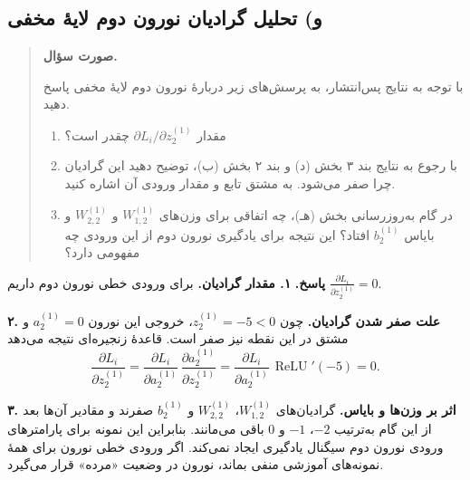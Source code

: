 \documentclass{article}
\numberwithin{equation}{section}
\numberwithin{table}{section}
\DeclareMathOperator{\ReLU}{ReLU}
\newenvironment{questionprompt}{%
    \begin{quote}\noindent\textbf{صورت سؤال.}\enspace\ignorespaces
}{%
    \end{quote}\noindent\textbf{پاسخ.}\enspace\ignorespacesafterend
}
\begin{document}
\subsection*{و) تحلیل گرادیان نورون دوم لایهٔ مخفی}
\begin{questionprompt}
    با توجه به نتایج پس‌انتشار، به پرسش‌های زیر دربارهٔ نورون دوم لایهٔ مخفی پاسخ دهید.
    \begin{enumerate}
        \item مقدار \(\partial L_i/\partial z_2^{(1)}\) چقدر است؟
        \item با رجوع به نتایج بند ۳ بخش (د) و بند ۲ بخش (ب)، توضیح دهید این گرادیان چرا صفر می‌شود. به مشتق تابع و مقدار ورودی آن اشاره کنید.
        \item در گام به‌روزرسانی بخش (هـ)، چه اتفاقی برای وزن‌های \(W_{1,2}^{(1)}\) و \(W_{2,2}^{(1)}\) و بایاس \(b_2^{(1)}\) افتاد؟ این نتیجه برای یادگیری نورون دوم از این ورودی چه مفهومی دارد؟
    \end{enumerate}
\end{questionprompt}
\textbf{۱. مقدار گرادیان.}
برای ورودی خطی نورون دوم داریم \(\frac{\partial L_i}{\partial z_2^{(1)}}=0\).

\noindent\textbf{۲. علت صفر شدن گرادیان.}
چون \(z_2^{(1)}=-5<0\)، خروجی این نورون \(a_2^{(1)}=0\) و مشتق  در این نقطه نیز صفر است. قاعدهٔ زنجیره‌ای نتیجه می‌دهد
\[
    \frac{\partial L_i}{\partial z_2^{(1)}}=
    \frac{\partial L_i}{\partial a_2^{(1)}}\,
    \frac{\partial a_2^{(1)}}{\partial z_2^{(1)}}
    =\frac{\partial L_i}{\partial a_2^{(1)}}\,\ReLU'(-5)=0.
\]

\noindent\textbf{۳. اثر بر وزن‌ها و بایاس.}
گرادیان‌های \(W_{1,2}^{(1)}\)، \(W_{2,2}^{(1)}\) و \(b_2^{(1)}\) صفرند و مقادیر آن‌ها بعد از این گام به‌ترتیب \(-2\)، \(-1\) و \(0\) باقی می‌مانند. بنابراین این نمونه برای پارامترهای ورودی نورون دوم سیگنال یادگیری ایجاد نمی‌کند. اگر ورودی خطی نورون برای همهٔ نمونه‌های آموزشی منفی بماند، نورون در وضعیت «مرده» قرار می‌گیرد.
\end{document}
